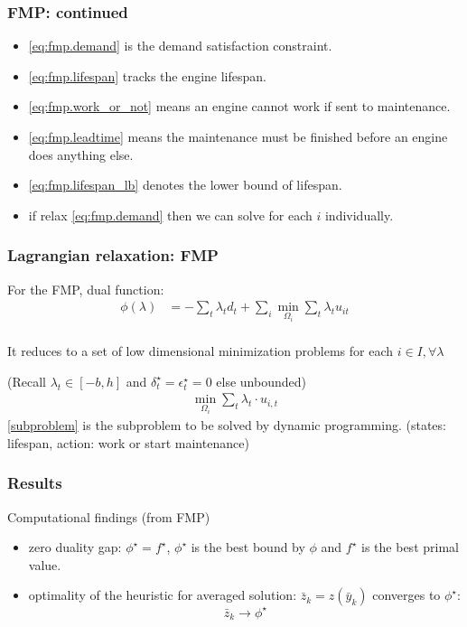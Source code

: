 \begin{frame}
  \frametitle{FMP: continued}
  \begin{itemize}
    \item \eqref{eq:fmp.demand} is the demand satisfaction constraint.
    \item \eqref{eq:fmp.lifespan} tracks the engine lifespan.
    \item \eqref{eq:fmp.work_or_not} means an engine cannot work if sent to maintenance.
    \item \eqref{eq:fmp.leadtime} means the maintenance must be finished before an engine does anything else.
    \item \eqref{eq:fmp.lifespan_lb} denotes the lower bound of lifespan.
    \item if relax \eqref{eq:fmp.demand} then we can solve for each \(i\) individually.
  \end{itemize}
\end{frame}

\begin{frame}
  \frametitle{Lagrangian relaxation: FMP}
  For the FMP, dual function:
  \[\begin{aligned}
      \phi(\lambda) & = - \sum_t \lambda_t d_t + \sum_i \min_{\Omega_i} \sum_t\lambda_t u_{it} \\
    \end{aligned}\]

  It reduces to a set of low dimensional minimization problems for each \(i \in I, \forall \lambda\)

  (Recall \(\lambda_t \in [-b, h] \) and \(\delta_t^\star = \epsilon_t^\star = 0\) else unbounded)
  \begin{equation}\label{subproblem}\begin{aligned}
      \min_{\Omega_i} \sum_t \lambda_t \cdot u_{i,t}
    \end{aligned}\end{equation}
  \eqref{subproblem} is the subproblem to be solved by dynamic programming. (states: lifespan, action: work or start maintenance)
\end{frame}


\begin{frame}
  \frametitle{Results}

  Computational findings (from FMP)

  \begin{itemize}
    \item zero duality gap: \(\phi^\star = f^\star\), \(\phi^\star\) is the best bound by \(\phi\) and \( f^\star\) is the best primal value.
    \item optimality of the heuristic for averaged solution: \(\bar z_k = z(\bar y_k)\) converges to \(\phi^\star\):
          \[\bar z_k \to \phi^\star \]
  \end{itemize}
\end{frame}

